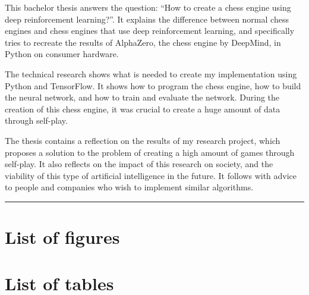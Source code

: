 \documentclass{article}
\makeatletter
\renewcommand\tableofcontents{%
  \null\hfill\textbf{\Huge\contentsname}\hfill\null\par
  \vline\noexpand\rule{\textwidth}{1pt}%
  \@mkboth{\MakeUppercase\contentsname}{\MakeUppercase\contentsname}%
  \@starttoc{toc}%
}
\makeatother
\begin{document}

This bachelor thesis answers the question: ``How to create a chess engine using deep reinforcement learning?''.
It explains the difference between normal chess engines and chess engines that use deep reinforcement learning, and
specifically tries to recreate the results of AlphaZero, the chess engine by DeepMind, in Python on consumer hardware. 

The technical research shows what is needed to create my implementation using Python and TensorFlow. 
It shows how to program the chess engine, how to build the neural network, and how to train and evaluate the network.
During the creation of this chess engine, it was crucial to create a huge amount of data through self-play.


The thesis contains a reflection on the results of my research project, which proposes a solution to the problem of
creating a high amount of games through self-play. It also reflects on the impact of this research on society, and the
viability of this type of artificial intelligence in the future. It follows with advice to people and companies who wish to implement similar algorithms. 



\newpage
\thispagestyle{empty}
\mbox{}
\newpage

\tableofcontents
\newpage

\section*{List of figures}
\renewcommand{\listfigurename}{}
\listoffigures
\newpage

\section*{List of tables}
\renewcommand{\listtablename}{}
\listoftables
\end{document}
